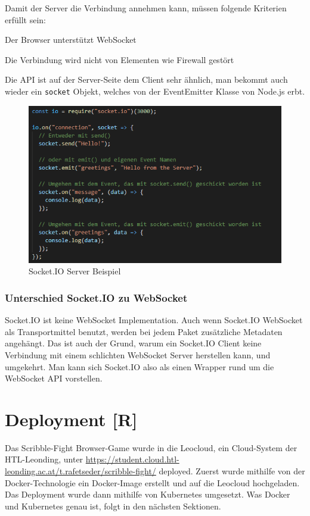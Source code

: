 Damit der Server die Verbindung annehmen kann, müssen folgende Kriterien erfüllt sein:
\begin{compactitem}
    \item Der Browser unterstützt WebSocket
    \item Die Verbindung wird nicht von Elementen wie Firewall gestört
\end{compactitem}
Die API ist auf der Server-Seite dem Client sehr ähnlich, man bekommt auch wieder ein \texttt{socket} Objekt, welches von der EventEmitter Klasse von Node.js erbt.

\begin{figure}[H]
    \centering
    \includegraphics[scale=1]{pics/SocketIO_server.PNG}
    \caption{Socket.IO Server Beispiel}
\end{figure}


\subsubsection{Unterschied Socket.IO zu WebSocket}
Socket.IO ist keine WebSocket Implementation. Auch wenn Socket.IO WebSocket als Transportmittel benutzt, werden bei jedem Paket zusätzliche Metadaten angehängt. Das ist auch der Grund, warum
ein Socket.IO Client keine Verbindung mit einem schlichten WebSocket Server herstellen kann, und umgekehrt.
Man kann sich Socket.IO also als einen Wrapper rund um die WebSocket API vorstellen.

\section{Deployment [R]}
Das Scribble-Fight Browser-Game wurde in die Leocloud, ein Cloud-System der HTL-Leonding, unter \url{https://student.cloud.htl-leonding.ac.at/t.rafetseder/scribble-fight/} deployed.
Zuerst wurde mithilfe von der Docker-Technologie ein Docker-Image erstellt und auf die Leocloud hochgeladen. Das Deployment wurde dann mithilfe von Kubernetes umgesetzt.
Was Docker und Kubernetes genau ist, folgt in den nächsten Sektionen.
